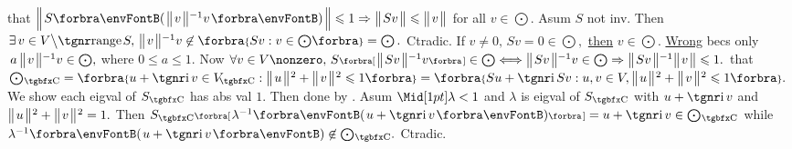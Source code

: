 \NOTICE that $\BigDvert{S\Par{\Dvert{v}{^{-1}}v}}\leqslant 1\Rightarrow\Dvert{Sv}\leqslant\Dvert{v}$ for all $v\in\bigodot.$\parSol{}
Asum $S$ not inv. Then $\exists\,v\in V\Backslash\range S,\,\Dvert{v}{^{-1}}v\not\in\Bra{Sv:v\in\bigodot\!}=\bigodot.$ Ctradic.\parSol{}
\ANote If $v\neq0,\,Sv=0\in\bigodot,$ \uline{then} $v\in\bigodot.$ \;\uline{Wrong} becs only $\,a\,\big\Vert\hspace{1pt}{}v{}\hspace{1pt}\big\Vert{^{-1}}v\in\bigodot,$ where $0\leqslant a\leqslant1.$\vspace{4pt}\parSol{}
Now $\forall v\in V\nonzero,\,S\Sbra{\Dvert{Sv}{^{-1}}v}\in\bigodot\Longleftrightarrow\Dvert{Sv}{^{-1}}v\in\bigodot\Rightarrow\Dvert{Sv}{^{-1}}\Dvert{v}\leqslant1.$\PfEnd\vspace{2pt}\parSol{}
\Or \NOTICE that \,$\bigodot{_{\!\Cbb}}=\Bra{u+\i\,v\in V_{\!\Cbb}:\Dvertsq{u}+\Dvertsq{v}\leqslant1}=\Bra{Su+\i\,Sv:u,v\in V,\Dvertsq{u}+\Dvertsq{v}\leqslant 1}.$\parSol{}
We show each eigval of $S_{\Cbb}$ has abs val $1.$ Then done by \TIPS.\parSol{}
Asum $\aMid{\lambda}<1$ and $\lambda$ is eigval of $S_{\Cbb}$ with $u+\i\,v$ and $\big\Vert\hspace{1pt}{}u{}\hspace{1pt}\big\Vert{\hspace{0.5pt}}{^2}+\big\Vert\hspace{1pt}{}v{}\hspace{1pt}\big\Vert{\hspace{0.5pt}}{^2}=1.$\parSol{}
Then $S_{\Cbb}\Sbra{\lambda^{-1}\Par{u+\i\,v}}=u+\i\,v\in\bigodot{_{\!\Cbb}}$ while $\lambda^{-1}\Par{u+\i\,v}\not\in\bigodot{_{\!\Cbb}}.$ Ctradic.\PfEnd
\SepLine\ChEnd

%
\pagebreak
{}

\vspace{6pt}

